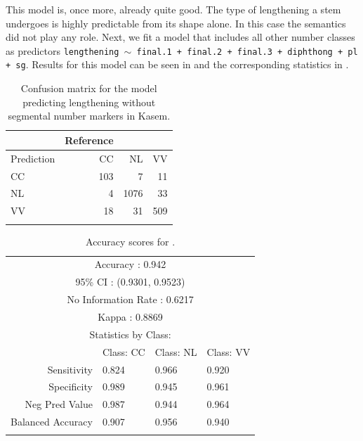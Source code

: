 This model is, once more, already quite good. The type of lengthening a stem undergoes is highly predictable from its shape alone. In this case the semantics did not play any role. Next, we fit a model that includes all other number classes as predictors \texttt{lengthening $\sim$ final.1 + final.2 + final.3 + diphthong + pl + sg}. Results for this model can be seen in  and the corresponding statistics in .

\begin{table}[p]
  \centering\small
  \begin{tabular}{lrrr}
    \lsptoprule
               & Reference        \\
    \midrule
    Prediction & CC  & NL   & VV  \\
    CC         & 103 & 7    & 11  \\
    NL         & 4   & 1076 & 33  \\
    VV         & 18  & 31   & 509 \\
    \lspbottomrule
  \end{tabular}
    \caption{Confusion matrix for the model predicting lengthening without segmental number markers in Kasem.}
  \label{tab:length-kasem-2}
\end{table}

\begin{table}[p]
  \centering\small
  \begin{tabular}{rlll}
    \lsptoprule
    \multicolumn{4}{c}{Overall Statistics}           \\
    \midrule
    \multicolumn{4}{c}{Accuracy : 0.942}             \\
    \multicolumn{4}{c}{95\% CI : (0.9301, 0.9523)}   \\
    \multicolumn{4}{c}{No Information Rate : 0.6217} \\
    \multicolumn{4}{c}{Kappa : 0.8869}               \\
    \midrule
    \multicolumn{4}{c}{Statistics by Class:}         \\
    \midrule

                      & Class: CC & Class: NL & Class: VV \\
    Sensitivity       & 0.824     & 0.966     & 0.920     \\
    Specificity       & 0.989     & 0.945     & 0.961     \\
    Neg Pred Value    & 0.987     & 0.944     & 0.964     \\
    Balanced Accuracy & 0.907     & 0.956     & 0.940     \\
    \lspbottomrule
  \end{tabular}
    \caption{Accuracy scores for .}\label{tab:length-kasem-2-stats}
\end{table}

